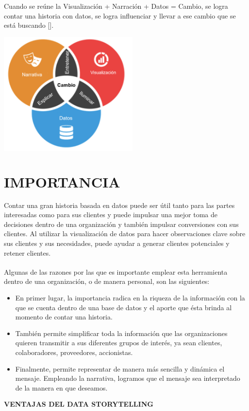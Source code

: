 \documentclass[preprint,12pt]{elsarticle}
\begin{document}
	Cuando se reúne la Visualización + Narración + Datos = Cambio, se logra contar una historia con datos, se logra influenciar y llevar a ese cambio que se está buscando [].
	
	\begin{center}
		\includegraphics[width=7cm]{./Imagenes/img2} 
	\end{center}

	\section{IMPORTANCIA}
	
	Contar una gran historia basada en datos puede ser útil tanto para las partes interesadas como para sus clientes y puede impulsar una mejor toma de decisiones dentro de una organización y también impulsar conversiones con sus clientes. Al utilizar la visualización de datos para hacer observaciones clave sobre sus clientes y sus necesidades, puede ayudar a generar clientes potenciales y retener clientes.\\
	\\
	Algunas de las razones por las que es importante emplear esta herramienta dentro de una organización, o de manera personal, son las siguientes:
	
	\begin{itemize}
		\item En primer lugar, la importancia radica en la riqueza de la información con la que se cuenta dentro de una base de datos y el aporte que ésta brinda al momento de contar una historia.
		\item También permite simplificar toda la información que las organizaciones quieren transmitir a sus diferentes grupos de interés, ya sean clientes, colaboradores, proveedores, accionistas.
		\item Finalmente, permite representar de manera más sencilla y dinámica el mensaje. Empleando la narrativa, logramos que el mensaje sea interpretado de la manera en que deseamos.
	\end{itemize}
	\textbf{VENTAJAS DEL DATA STORYTELLING}\\
	
\end{document}
